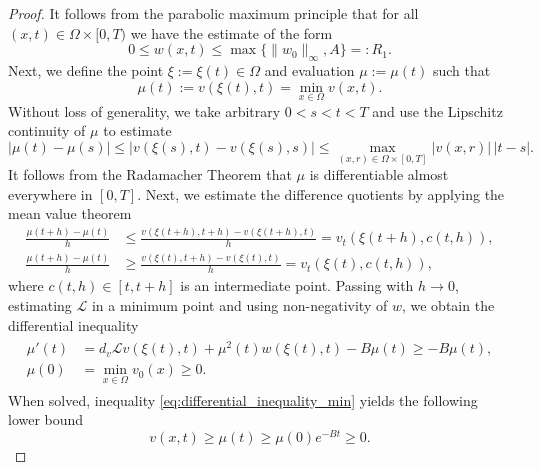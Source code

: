 \documentclass[11pt, a4paper]{article}
\theoremstyle{break}
\theoremstyle{break}
\theoremstyle{break}
\theoremstyle{break}
\theoremstyle{break}
\theoremstyle{break}
\theoremstyle{break}
\theoremstyle{break}
\theoremstyle{break}
\theoremstyle{break}
\begin{document}
\begin{proof}
    It follows from the parabolic maximum principle that for all $(x, t) \in \Omega \times [0, T)$ we have the estimate of the form
    \begin{equation}
        \label{EQ:AprioriEstimate_V}
        0 \leq w(x, t) \leq \max\{\|w_0\|_\infty, A\} =: R_1.
    \end{equation}
    Next, we define the point $\xi := \xi(t) \in \Omega$ and evaluation $\mu := \mu(t)$ such that 
    \begin{equation*}
        \mu(t) := v(\xi(t), t) = \min_{x \in \Omega} v(x, t).
    \end{equation*}
    Without loss of generality, we take arbitrary $0 < s < t < T$ and use the 
    Lipschitz continuity of $\mu$ to estimate
    \begin{equation*}
        \left|\mu(t) - \mu(s)\right| \leq \left|v(\xi(s), t) - v(\xi(s), s)\right| \leq \max_{(x, r) \in \Omega \times [0, T]} |v(x, r)|\, |t-s|.
    \end{equation*}
    It follows from the Radamacher Theorem \cite[Theorem 3.2]{EvansGariepy2015} that $\mu$ is differentiable almost everywhere in $[0, T]$. Next, we estimate the difference quotients by applying the mean value theorem
    \begin{align*}
        \frac{\mu(t+h) - \mu(t)}{h} &\leq \frac{v(\xi(t+h), t+h) - v(\xi(t + h), t)}{h} = v_t(\xi(t + h), c(t, h)), \\
        \frac{\mu(t+h) - \mu(t)}{h} &\geq \frac{v(\xi(t), t+h) - v(\xi(t), t)}{h} = v_t(\xi(t), c(t, h)),
    \end{align*}
    where $c(t,h) \in [t, t+h]$ is an intermediate point. Passing with $h \rightarrow 0$, estimating $\mathcal{L}$ in a minimum point and using non-negativity of $w$, we obtain the differential inequality
    \begin{align}
        \label{eq:differential_inequality_min}
        \begin{split}
            \mu'(t) &= d_v \mathcal{L} v(\xi(t), t) + \mu^2(t) w(\xi(t), t) - B \mu(t) \geq - B \mu(t), \\
            \mu(0) &= \min_{x \in \Omega} v_0(x) \geq 0.
        \end{split}
    \end{align}
    When solved, inequality \eqref{eq:differential_inequality_min} yields the following lower bound 
    \begin{equation*}
        v(x,t) \geq \mu(t) \geq \mu(0) e^{-B t} \geq 0.
    \end{equation*}

\end{proof}
\end{document}
